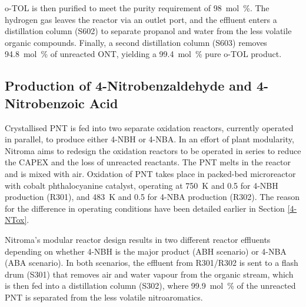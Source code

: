 
o-TOL is then purified to meet the purity requirement of \SI{98}{mol\percent}.
The hydrogen gas leaves the reactor via an outlet port, and the effluent enters a distillation column (S602) to separate propanol and water from the less volatile organic compounds.
Finally, a second distillation column (S603) removes \SI{94.8}{mol\percent} of unreacted ONT, yielding a \SI{99.4}{mol\percent} pure o-TOL product.
 
\subsection{Production of 4-Nitrobenzaldehyde and 4-Nitrobenzoic Acid}
Crystallised PNT is fed into two separate oxidation reactors, currently operated in parallel, to produce either 4-NBH or 4-NBA. In an effort of plant modularity, Nitroma aims to redesign the oxidation reactors to be operated in series to reduce the CAPEX and the loss of unreacted reactants. The PNT melts in the reactor and is mixed with air. Oxidation of PNT takes place in packed-bed microreactor with cobalt phthalocyanine catalyst, operating at \SI{750}{\K} and \SI{0.5}{\atm} for 4-NBH production (R301), and \SI{483}{\K} and \SI{0.5}{\atm} for 4-NBA production (R302). The reason for the difference in operating conditions have been detailed earlier in Section \ref{4-NTox}.


Nitroma's modular reactor design results in two different reactor effluents depending on whether 4-NBH is the major product (ABH scenario) or 4-NBA (ABA scenario). In both scenarios, the effluent from R301/R302 is sent to a flash drum (S301) that removes air and water vapour from the organic stream, which is then fed into a distillation column (S302), where \SI{99.9}{mol\percent} of the unreacted PNT is separated from the less volatile nitroaromatics. 


